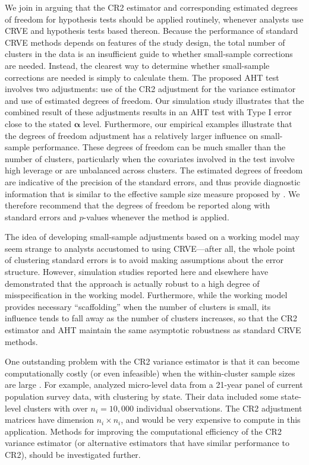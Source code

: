 \documentclass[draft]{ectaart}\usepackage[]{graphicx}\usepackage[]{color}
\newcommand{\bs}{\boldsymbol}
\begin{document}
We join \citet{Imbens2015robust} in arguing that the CR2 estimator and corresponding estimated degrees of freedom for hypothesis tests should be applied routinely, whenever analysts use CRVE and hypothesis tests based thereon. 
Because the performance of standard CRVE methods depends on features of the study design, the total number of clusters in the data is an insufficient guide to whether small-sample corrections are needed. 
Instead, the clearest way to determine whether small-sample corrections are needed is simply to calculate them.
The proposed AHT test involves two adjustments: use of the CR2 adjustment for the variance estimator and use of estimated degrees of freedom. 
Our simulation study illustrates that the combined result of these adjustments results in an AHT test with Type I error close to the stated $\bs\alpha$ level. 
Furthermore, our empirical examples illustrate that the degrees of freedom adjustment has a relatively larger influence on small-sample performance.
These degrees of freedom can be much smaller than the number of clusters, particularly when the covariates involved in the test involve high leverage or are unbalanced across clusters.
The estimated degrees of freedom are indicative of the precision of the standard errors, and thus provide diagnostic information that is similar to the effective sample size measure proposed by \citet{Carter2013asymptotic}. 
We therefore recommend that the degrees of freedom be reported along with standard errors and $p$-values whenever the method is applied.

The idea of developing small-sample adjustments based on a working model may seem strange to analysts accustomed to using CRVE---after all, the whole point of clustering standard errors is to avoid making assumptions about the error structure.
However, simulation studies reported here and elsewhere \citep{Tipton2015small-t, Tipton2015small-F} have demonstrated that the approach is actually robust to a high degree of misspecification in the working model. 
Furthermore, while the working model provides necessary ``scaffolding'' when the number of clusters is small, its  influence tends to fall away as the number of clusters increases, so that the CR2 estimator and AHT maintain the same asymptotic robustness as standard CRVE methods. 

One outstanding problem with the CR2 variance estimator is that it can become computationally costly (or even infeasible) when the within-cluster sample sizes are large \citep{Mackinnon2014wild}. 
For example, \citet{Bertrand2004how} analyzed micro-level data from a 21-year panel of current population survey data, with clustering by state. Their data included some state-level clusters with over $n_i = 10,000$ individual observations. 
The CR2 adjustment matrices have dimension $n_i \times n_i$, and would be very expensive to compute in this application. 
Methods for improving the computational efficiency of the CR2 variance estimator (or alternative estimators that have similar performance to CR2), should be investigated further. 
\end{document}
